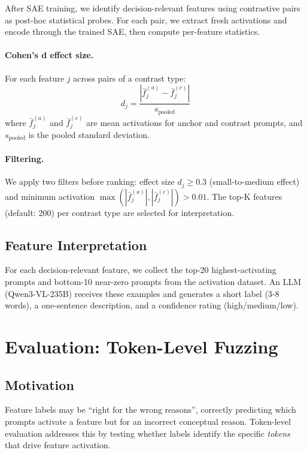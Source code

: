 \documentclass[runningheads]{llncs}
\begin{document}
After SAE training, we identify decision-relevant features using contrastive pairs as post-hoc statistical probes. For each pair, we extract fresh activations and encode through the trained SAE, then compute per-feature statistics.

\paragraph{Cohen's d effect size.} For each feature $j$ across pairs of a contrast type:
\begin{equation}
d_j = \frac{|\bar{f}^{(a)}_j - \bar{f}^{(c)}_j|}{s_\text{pooled}}
\end{equation}
where $\bar{f}^{(a)}_j$ and $\bar{f}^{(c)}_j$ are mean activations for anchor and contrast prompts, and $s_\text{pooled}$ is the pooled standard deviation.

\paragraph{Filtering.} We apply two filters before ranking: effect size $d_j \geq 0.3$ (small-to-medium effect) and minimum activation $\max(|\bar{f}^{(a)}_j|, |\bar{f}^{(c)}_j|) > 0.01$. The top-K features (default: 200) per contrast type are selected for interpretation.

\subsection{Feature Interpretation}

For each decision-relevant feature, we collect the top-20 highest-activating prompts and bottom-10 near-zero prompts from the activation dataset. An LLM (Qwen3-VL-235B) receives these examples and generates a short label (3-8 words), a one-sentence description, and a confidence rating (high/medium/low).


\section{Evaluation: Token-Level Fuzzing}
\label{sec:evaluation}

\subsection{Motivation}

Feature labels may be ``right for the wrong reasons'', correctly predicting which prompts activate a feature but for an incorrect conceptual reason. Token-level evaluation addresses this by testing whether labels identify the specific \emph{tokens} that drive feature activation.
\end{document}
